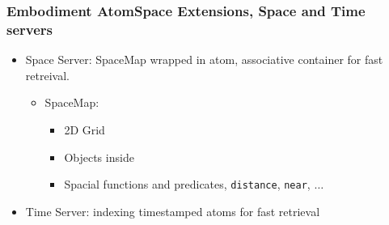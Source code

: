 \documentclass{beamer}
\begin{document}
\frame
{
  \frametitle{Embodiment AtomSpace Extensions, \alert{Space and Time servers}}


  \begin{itemize}
  \item<+-> Space Server: SpaceMap wrapped in atom,
    associative container for fast retreival.
    \begin{itemize}
    \item SpaceMap:
      \begin{itemize}
      \item 2D Grid
      \item Objects inside
      \item Spacial functions and predicates, {\tt distance}, {\tt near}, 
        $\ldots$
      \end{itemize}
    \end{itemize}
  \item<+-> Time Server: indexing timestamped atoms for fast retrieval
  \end{itemize}

  \begin{center}
  \end{center}
}
\end{document}
